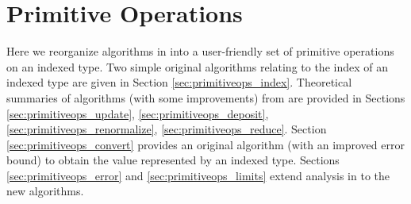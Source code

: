 \section{Primitive Operations}
    \label{sec:primitiveops}
    Here we reorganize algorithms in \cite{repsum} into a user-friendly set of
    primitive operations on an indexed type. Two simple original algorithms
    relating to the index of an indexed type are given in Section
    \ref{sec:primitiveops_index}. Theoretical summaries of algorithms (with
    some improvements) from \cite{repsum} are provided in Sections
    \ref{sec:primitiveops_update}, \ref{sec:primitiveops_deposit},
    \ref{sec:primitiveops_renormalize}, \ref{sec:primitiveops_reduce}. Section
    \ref{sec:primitiveops_convert} provides an original algorithm (with an
    improved error bound) to obtain the value represented by an indexed type.
    Sections \ref{sec:primitiveops_error} and \ref{sec:primitiveops_limits}
    extend analysis in \cite{repsum} to the new algorithms.

    
    
    
    
    
    
    
    
    
    

